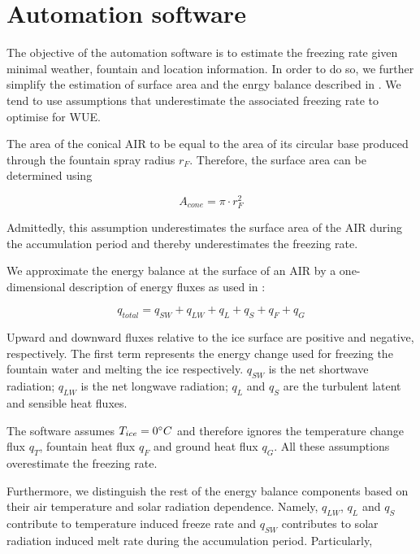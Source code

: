 \documentclass[utf8]{frontiersSCNS}
\begin{document}
\section{Automation software}
The objective of the automation software is to estimate the freezing rate given minimal weather, fountain and
location information. In order to do so, we further simplify the estimation of surface area and the enrgy
balance described in \cite{Balasubramanian_2022}.  We tend to use assumptions that underestimate the associated freezing rate to optimise for WUE.

The area of the conical AIR to be equal to the area of its circular base produced through the fountain spray
radius $r_F$. Therefore, the surface area can be determined using

\begin{equation} A_{cone} =\pi \cdot r_{F}^2 \label{eq:Area} \end{equation}

Admittedly, this assumption underestimates the surface area of the AIR during the accumulation period and
thereby underestimates the freezing rate.

We approximate the energy balance at the surface of an AIR by a one-dimensional description of energy fluxes as
used in \cite{Balasubramanian_2022}:

\begin{equation}
	 q_{total} = q_{SW} + q_{LW} + q_{L} + q_{S} + q_{F} + q_{G}
	\label{eqn:EB}
\end{equation}

Upward and downward fluxes relative to the ice surface are positive and negative, respectively. The first
term represents the energy change used for freezing the fountain water and melting the ice respectively.
$q_{SW}$ is the net shortwave radiation; $q_{LW}$ is the net longwave radiation; $q_{L}$ and $q_{S}$ are the
turbulent latent and sensible heat fluxes. 

The software assumes $T_{ice} = 0 \degree C$ and therefore ignores the temperature change flux $q_{T}$, fountain
heat flux $q_{F}$ and ground heat flux $q_{G}$. All these assumptions overestimate the freezing rate.

Furthermore, we distinguish the rest of the energy balance components based on their air temperature and solar
radiation dependence. Namely, $q_{LW}$, $q_{L}$ and $q_{S}$ contribute to temperature induced freeze rate and
$q_{SW}$ contributes to solar radiation induced melt rate during the accumulation period.  Particularly,
\end{document}
